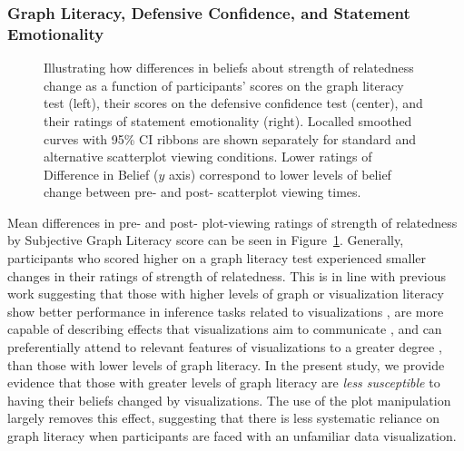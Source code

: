 \documentclass[manuscript,screen,review,anonymous]{acmart}
\begin{document}
\subsubsection{Graph Literacy, Defensive Confidence, and Statement
Emotionality}\label{sec-add-analyses-discussion}

\begin{figure}


\caption{\label{fig-add-analyses-plots}Illustrating how differences in
beliefs about strength of relatedness change as a function of
participants' scores on the graph literacy test (left), their scores on
the defensive confidence test (center), and their ratings of statement
emotionality (right). Localled smoothed curves with 95\% CI ribbons are
shown separately for standard and alternative scatterplot viewing
conditions. Lower ratings of Difference in Belief (\(y\) axis)
correspond to lower levels of belief change between pre- and post-
scatterplot viewing times.}

\end{figure}%

Mean differences in pre- and post- plot-viewing ratings of strength of
relatedness by Subjective Graph Literacy score can be seen in
Figure~\ref{fig-add-analyses-plots}. Generally, participants who scored
higher on a graph literacy test experienced smaller changes in their
ratings of strength of relatedness. This is in line with previous work
suggesting that those with higher levels of graph or visualization
literacy show better performance in inference tasks related to
visualizations \citep{canham_2010}, are more capable of describing
effects that visualizations aim to communicate \citep{shah_2011}, and
can preferentially attend to relevant features of visualizations to a
greater degree \citep{okan_2016}, than those with lower levels of graph
literacy. In the present study, we provide evidence that those with
greater levels of graph literacy are \emph{less susceptible} to having
their beliefs changed by visualizations. The use of the plot
manipulation largely removes this effect, suggesting that there is less
systematic reliance on graph literacy when participants are faced with
an unfamiliar data visualization.
\end{document}
